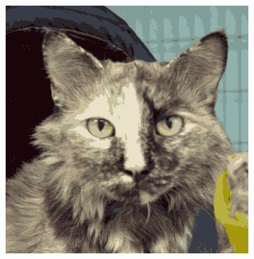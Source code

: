 \begin{figure}[htb]
\begin{subfigure}{.3\textwidth}
    \end{subfigure}
    \begin{subfigure}{.3\textwidth}
        \includegraphics[width=\linewidth]{../../python_code/plots/kmeans/cat-10/reconstruction.png}
    \end{subfigure}
\end{figure}